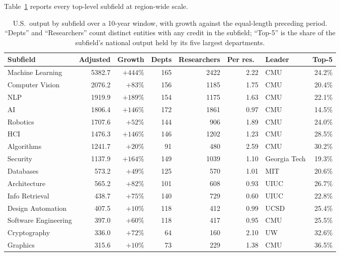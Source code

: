 \documentclass[11pt]{article}
\begin{document}
Table~\ref{tab:fields} reports every top-level subfield at region-wide scale.

\begin{table}[p]
\centering
\small
\caption{U.S.\ output by subfield over a 10-year window, with growth against
the equal-length preceding period. ``Depts'' and ``Researchers'' count distinct
entities with any credit in the subfield; ``Top-5'' is the share of the
subfield's national output held by its five largest departments.}
\label{tab:fields}
\setlength{\tabcolsep}{4.5pt}
\begin{tabular}{lrrrrrlr}
\toprule
Subfield & Adjusted & Growth & Depts & Researchers & Per res.\ & Leader & Top-5 \\
\midrule
Machine Learning      & 5382.7 & $+444$\% & 165 & 2422 & 2.22 & CMU          & 24.2\% \\
Computer Vision       & 2076.2 & $+83$\%  & 156 & 1185 & 1.75 & CMU          & 20.4\% \\
NLP                   & 1919.9 & $+189$\% & 154 & 1175 & 1.63 & CMU          & 22.1\% \\
AI                    & 1806.4 & $+146$\% & 172 & 1861 & 0.97 & CMU          & 14.5\% \\
Robotics              & 1707.6 & $+52$\%  & 144 & 906  & 1.89 & CMU          & 24.0\% \\
HCI                   & 1476.3 & $+146$\% & 146 & 1202 & 1.23 & CMU          & 28.5\% \\
Algorithms            & 1241.7 & $+20$\%  & 91  & 480  & 2.59 & CMU          & 30.2\% \\
Security              & 1137.9 & $+164$\% & 149 & 1039 & 1.10 & Georgia Tech & 19.3\% \\
Databases             & 573.2  & $+49$\%  & 125 & 570  & 1.01 & MIT          & 20.6\% \\
Architecture          & 565.2  & $+82$\%  & 101 & 608  & 0.93 & UIUC         & 26.7\% \\
Info Retrieval        & 438.7  & $+75$\%  & 140 & 729  & 0.60 & UIUC         & 22.8\% \\
Design Automation     & 407.5  & $+10$\%  & 118 & 412  & 0.99 & UCSD         & 25.4\% \\
Software Engineering  & 397.0  & $+60$\%  & 118 & 417  & 0.95 & CMU          & 25.5\% \\
Cryptography          & 336.0  & $+72$\%  & 64  & 160  & 2.10 & UW           & 32.6\% \\
Graphics              & 315.6  & $+10$\%  & 73  & 229  & 1.38 & CMU          & 36.5\% \\

\end{tabular}
\end{table}
\end{document}
